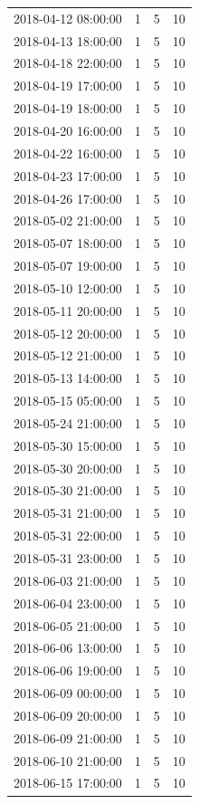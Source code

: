 \begin{tabular}{lrrr}
2018-04-12 08:00:00 & 1 & 5 & 10 \\
2018-04-13 18:00:00 & 1 & 5 & 10 \\
2018-04-18 22:00:00 & 1 & 5 & 10 \\
2018-04-19 17:00:00 & 1 & 5 & 10 \\
2018-04-19 18:00:00 & 1 & 5 & 10 \\
2018-04-20 16:00:00 & 1 & 5 & 10 \\
2018-04-22 16:00:00 & 1 & 5 & 10 \\
2018-04-23 17:00:00 & 1 & 5 & 10 \\
2018-04-26 17:00:00 & 1 & 5 & 10 \\
2018-05-02 21:00:00 & 1 & 5 & 10 \\
2018-05-07 18:00:00 & 1 & 5 & 10 \\
2018-05-07 19:00:00 & 1 & 5 & 10 \\
2018-05-10 12:00:00 & 1 & 5 & 10 \\
2018-05-11 20:00:00 & 1 & 5 & 10 \\
2018-05-12 20:00:00 & 1 & 5 & 10 \\
2018-05-12 21:00:00 & 1 & 5 & 10 \\
2018-05-13 14:00:00 & 1 & 5 & 10 \\
2018-05-15 05:00:00 & 1 & 5 & 10 \\
2018-05-24 21:00:00 & 1 & 5 & 10 \\
2018-05-30 15:00:00 & 1 & 5 & 10 \\
2018-05-30 20:00:00 & 1 & 5 & 10 \\
2018-05-30 21:00:00 & 1 & 5 & 10 \\
2018-05-31 21:00:00 & 1 & 5 & 10 \\
2018-05-31 22:00:00 & 1 & 5 & 10 \\
2018-05-31 23:00:00 & 1 & 5 & 10 \\
2018-06-03 21:00:00 & 1 & 5 & 10 \\
2018-06-04 23:00:00 & 1 & 5 & 10 \\
2018-06-05 21:00:00 & 1 & 5 & 10 \\
2018-06-06 13:00:00 & 1 & 5 & 10 \\
2018-06-06 19:00:00 & 1 & 5 & 10 \\
2018-06-09 00:00:00 & 1 & 5 & 10 \\
2018-06-09 20:00:00 & 1 & 5 & 10 \\
2018-06-09 21:00:00 & 1 & 5 & 10 \\
2018-06-10 21:00:00 & 1 & 5 & 10 \\
2018-06-15 17:00:00 & 1 & 5 & 10 \\

\end{tabular}
